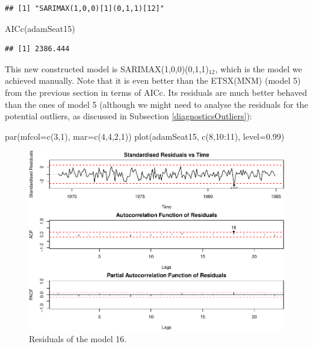 \documentclass[
]{book}
\newenvironment{Shaded}{\begin{snugshade}}{\end{snugshade}}
\newcommand{\AttributeTok}[1]{\textcolor[rgb]{0.77,0.63,0.00}{#1}}
\newcommand{\DecValTok}[1]{\textcolor[rgb]{0.00,0.00,0.81}{#1}}
\newcommand{\FloatTok}[1]{\textcolor[rgb]{0.00,0.00,0.81}{#1}}
\newcommand{\FunctionTok}[1]{\textcolor[rgb]{0.00,0.00,0.00}{#1}}
\newcommand{\NormalTok}[1]{#1}
\newcommand{\SpecialCharTok}[1]{\textcolor[rgb]{0.00,0.00,0.00}{#1}}
\theoremstyle{definition}
\theoremstyle{definition}
\theoremstyle{definition}
\theoremstyle{definition}
\theoremstyle{remark}
\begin{document}
\begin{verbatim}
## [1] "SARIMAX(1,0,0)[1](0,1,1)[12]"
\end{verbatim}

\begin{Shaded}
\begin{Highlighting}[]
\FunctionTok{AICc}\NormalTok{(adamSeat15)}
\end{Highlighting}
\end{Shaded}

\begin{verbatim}
## [1] 2386.444
\end{verbatim}

This new constructed model is SARIMAX(1,0,0)(0,1,1)\(_{12}\), which is the model we achieved manually. Note that it is even better than the ETSX(MNM) (model 5) from the previous section in terms of AICc. Its residuals are much better behaved than the ones of model 5 (although we might need to analyse the residuals for the potential outliers, as discussed in Subsection \ref{diagnosticsOutliers}):

\begin{Shaded}
\begin{Highlighting}[]
\FunctionTok{par}\NormalTok{(}\AttributeTok{mfcol=}\FunctionTok{c}\NormalTok{(}\DecValTok{3}\NormalTok{,}\DecValTok{1}\NormalTok{), }\AttributeTok{mar=}\FunctionTok{c}\NormalTok{(}\DecValTok{4}\NormalTok{,}\DecValTok{4}\NormalTok{,}\DecValTok{2}\NormalTok{,}\DecValTok{1}\NormalTok{))}
\FunctionTok{plot}\NormalTok{(adamSeat15, }\FunctionTok{c}\NormalTok{(}\DecValTok{8}\NormalTok{,}\DecValTok{10}\SpecialCharTok{:}\DecValTok{11}\NormalTok{), }\AttributeTok{level=}\FloatTok{0.99}\NormalTok{)}
\end{Highlighting}
\end{Shaded}

\begin{figure}
\centering
\includegraphics{Svetunkov--2022----ADAM_files/figure-latex/adamSeat16Resid-1.pdf}
\caption{\label{fig:adamSeat16Resid}Residuals of the model 16.}
\end{figure}
\end{document}
